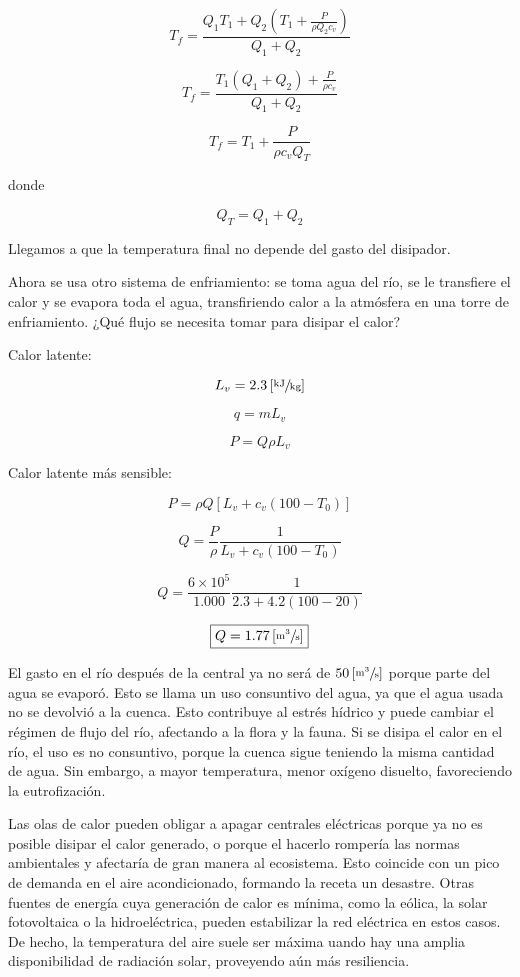 \documentclass[11pt]{article}
\begin{document}
\[ T_f = \frac{Q_1 T_1 + Q_2 \left( T_1 + \frac{P}{\rho Q_2 c_v} \right)}{Q_1 + Q_2} \]

\[ T_f = \frac{T_1 \left( Q_1 + Q_2 \right) + \frac{P}{\rho c_v}}{Q_1 + Q_2} \]

\[ \boxed{ T_f = T_1 + \frac{P}{\rho c_v Q_T} } \]

donde

\[ Q_T = Q_1 + Q_2 \]

Llegamos a que la temperatura final no depende del gasto del disipador.

Ahora se usa otro sistema de enfriamiento: se toma agua del río, se le transfiere el calor y se evapora toda el agua, transfiriendo calor a la atmósfera en una torre de enfriamiento. ¿Qué flujo se necesita tomar para disipar el calor?

Calor latente:

\[ L_v = 2.3 \left[ \sfrac{\text{kJ}}{\text{kg}} \right] \]

\[ q = m L_v \]

\[ P = Q \rho L_v \]

Calor latente más sensible:

\[ P = \rho Q \left[ L_v + c_v \left( 100 - T_0 \right) \right] \]

\[ Q = \frac{P}{\rho} \frac{1}{L_v + c_v \left( 100 - T_0 \right)} \]

\[ Q = \frac{6 \times 10^5}{1.000} \frac{1}{ 2.3 + 4.2 \left( 100 - 20 \right)} \]

\[ \boxed{ Q = 1.77 \left[ \sfrac{\text{m}^3}{\text{s}} \right] } \]

El gasto en el río después de la central ya no será de \( 50 \left[ \sfrac{\text{m}^3}{\text{s}} \right] \) porque parte del agua se evaporó. Esto se llama un uso consuntivo del agua, ya que el agua usada no se devolvió a la cuenca. Esto contribuye al estrés hídrico y puede cambiar el régimen de flujo del río, afectando a la flora y la fauna. Si se disipa el calor en el río, el uso es no consuntivo, porque la cuenca sigue teniendo la misma cantidad de agua. Sin embargo, a mayor temperatura, menor oxígeno disuelto, favoreciendo la eutrofización.

Las olas de calor pueden obligar a apagar centrales eléctricas porque ya no es posible disipar el calor generado, o porque el hacerlo rompería las normas ambientales y afectaría de gran manera al ecosistema. Esto coincide con un pico de demanda en el aire acondicionado, formando la receta un desastre. Otras fuentes de energía cuya generación de calor es mínima, como la eólica, la solar fotovoltaica o la hidroeléctrica, pueden estabilizar la red eléctrica en estos casos. De hecho, la temperatura del aire suele ser máxima uando hay una amplia disponibilidad de radiación solar, proveyendo aún más resiliencia.
\end{document}
